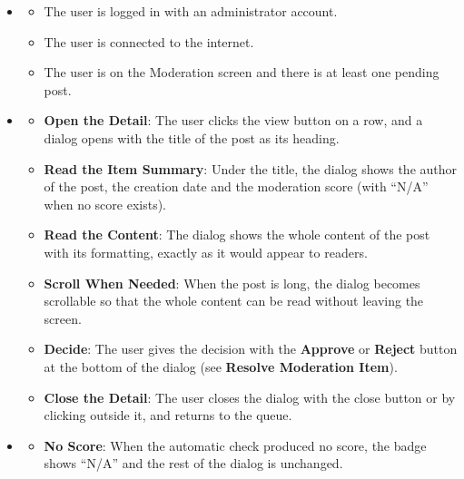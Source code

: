 \begin{itemize}[leftmargin=1.6em,topsep=4pt,itemsep=3pt,parsep=0pt,label=$\bullet$]
    \item {}
        \begin{itemize}[leftmargin=2.2em,topsep=2pt,itemsep=3pt,parsep=0pt,label=$\circ$]
            \item The user is logged in with an administrator account.
            \item The user is connected to the internet.
            \item The user is on the Moderation screen and there is at least one pending post.
        \end{itemize}
    \item {}
        \begin{itemize}[leftmargin=2.2em,topsep=2pt,itemsep=3pt,parsep=0pt,label=$\circ$]
            \item \textbf{Open the Detail}: The user clicks the view button on a row, and a dialog opens with the title of the post as its heading.
            \item \textbf{Read the Item Summary}: Under the title, the dialog shows the author of the post, the creation date and the moderation score (with ``N/A'' when no score exists).
            \item \textbf{Read the Content}: The dialog shows the whole content of the post with its formatting, exactly as it would appear to readers.
            \item \textbf{Scroll When Needed}: When the post is long, the dialog becomes scrollable so that the whole content can be read without leaving the screen.
            \item \textbf{Decide}: The user gives the decision with the \textbf{Approve} or \textbf{Reject} button at the bottom of the dialog (see \textbf{Resolve Moderation Item}).
            \item \textbf{Close the Detail}: The user closes the dialog with the close button or by clicking outside it, and returns to the queue.
        \end{itemize}
    \item {}
        \begin{itemize}[leftmargin=2.2em,topsep=2pt,itemsep=3pt,parsep=0pt,label=$\circ$]
            \item \textbf{No Score}: When the automatic check produced no score, the badge shows ``N/A'' and the rest of the dialog is unchanged.

\end{itemize}
\end{itemize}
